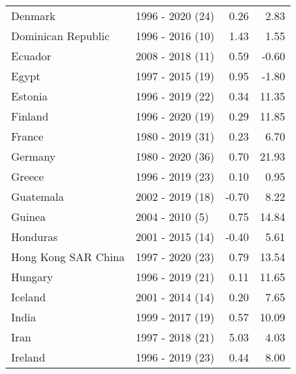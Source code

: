 \begin{table}[pos=h]
{{\begin{tabular}{llrr}
\addlinespace
Denmark & 1996 - 2020 (24) & 0.26 & 2.83\\
Dominican Republic & 1996 - 2016 (10) & 1.43 & 1.55\\
Ecuador & 2008 - 2018 (11) & 0.59 & -0.60\\
Egypt & 1997 - 2015 (19) & 0.95 & -1.80\\
Estonia & 1996 - 2019 (22) & 0.34 & 11.35\\
\addlinespace
Finland & 1996 - 2020 (19) & 0.29 & 11.85\\
France & 1980 - 2019 (31) & 0.23 & 6.70\\
Germany & 1980 - 2020 (36) & 0.70 & 21.93\\
Greece & 1996 - 2019 (23) & 0.10 & 0.95\\
Guatemala & 2002 - 2019 (18) & -0.70 & 8.22\\
\addlinespace
Guinea & 2004 - 2010 (5) & 0.75 & 14.84\\
Honduras & 2001 - 2015 (14) & -0.40 & 5.61\\
Hong Kong SAR China & 1997 - 2020 (23) & 0.79 & 13.54\\
Hungary & 1996 - 2019 (21) & 0.11 & 11.65\\
Iceland & 2001 - 2014 (14) & 0.20 & 7.65\\
\addlinespace
India & 1999 - 2017 (19) & 0.57 & 10.09\\
Iran & 1997 - 2018 (21) & 5.03 & 4.03\\
Ireland & 1996 - 2019 (23) & 0.44 & 8.00\\
\bottomrule \end{tabular}
}

}
\end{table}
